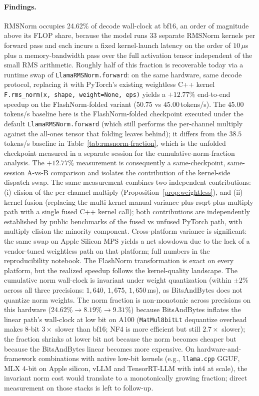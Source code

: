 \documentclass{article}
\begin{document}
\paragraph{Findings.} RMSNorm occupies 24.62\% of decode wall-clock at bf16, an order of magnitude above its FLOP share, because the model runs 33 separate RMSNorm kernels per forward pass and each incurs a fixed kernel-launch latency on the order of $10\,\mu$s plus a memory-bandwidth pass over the full activation tensor independent of the small RMS arithmetic. Roughly half of this fraction is recoverable today via a runtime swap of \texttt{LlamaRMSNorm.forward}: on the same hardware, same decode protocol, replacing it with PyTorch's existing weightless C++ kernel \texttt{F.rms\_norm(x, shape, weight=None, eps)} yields a $\mathbf{+12.77\%}$ end-to-end speedup on the FlashNorm-folded variant
($50.75$ vs $45.00$\,tokens/s).
The $45.00$\,tokens/s baseline here is the FlashNorm-folded checkpoint executed under the default \texttt{LlamaRMSNorm.forward} (which still performs the per-channel multiply against the all-ones tensor that folding leaves behind); it differs from the $38.5$\,tokens/s baseline in Table~\ref{tab:rmsnorm-fraction}, which is the unfolded checkpoint measured in a separate session for the cumulative-norm-fraction analysis. The $+12.77\%$ measurement is consequently a same-checkpoint, same-session A-vs-B comparison and isolates the contribution of the kernel-side dispatch swap. The same measurement combines two independent contributions: (i) elision of the per-channel multiply (Proposition~\ref{prop:weightless}), and (ii) kernel fusion (replacing the multi-kernel manual variance-plus-rsqrt-plus-multiply path with a single fused C++ kernel call); both contributions are independently established by public benchmarks of the fused vs unfused PyTorch path, with multiply elision the minority component. Cross-platform variance is significant: the same swap on Apple Silicon MPS yields a net slowdown due to the lack of a vendor-tuned weightless path on that platform; full numbers in the reproducibility notebook. The FlashNorm transformation is exact on every platform, but the realized speedup follows the kernel-quality landscape.
The cumulative norm wall-clock is invariant under weight quantization (within $\pm 2\%$ across all three precisions: $1{,}640$, $1{,}675$, $1{,}650$\,ms), as BitsAndBytes does not quantize norm weights. The norm fraction is non-monotonic across precisions on this hardware ($24.62\% \to 8.19\% \to 9.31\%$) because BitsAndBytes inflates the linear path's wall-clock at low bit on A100 (\texttt{MatMul8bitLt} dequantize overhead makes 8-bit $3\times$ slower than bf16; NF4 is more efficient but still $2.7\times$ slower); the fraction shrinks at lower bit not because the norm becomes cheaper but because the BitsAndBytes linear becomes more expensive. On hardware-and-framework combinations with native low-bit kernels (e.g., \texttt{llama.cpp} GGUF, MLX 4-bit on Apple silicon, vLLM and TensorRT-LLM with int4 at scale), the invariant norm cost would translate to a monotonically growing fraction; direct measurement on those stacks is left to follow-up.
\end{document}
